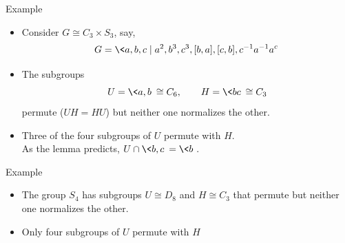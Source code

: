\begin{frame}[fragile,label=ExampleOfPermutingIso1,shrink=5]{Example}

  \begin{itemize}
  \item<1-> Consider $G\cong C_3 \times S_3$, say,
    \[G = \<a,b,c \mid a^2, b^3, c^3, [b,a], [c,b], c^{-1}a^{-1}a^c\>\]
\item<2->The subgroups 
\[U = \<a,b\> \cong C_6, \qquad H = \<bc\>\cong C_3\]
permute ($UH = HU$) but neither one normalizes the other.
  \end{itemize}
\vskip4mm
  \begin{itemize}
  \item<4-> Three of the four subgroups of $U$ permute with $H$.
\\[4pt] As the lemma predicts, $U\cap \<b, c\> = \<b\>$.
  \end{itemize}
\end{frame}


\begin{frame}[fragile,label=ExampleOfPermutingIso,shrink=5]{Example}

  \begin{itemize}
  \item<1-> The group $S_4$ has subgroups $U\cong D_8$ and $H\cong C_3$ that
    permute but neither one normalizes the other.
  \end{itemize}
\vskip4mm
\begin{itemize}
\item<2-> Only four subgroups of $U$ permute with $H$%
\end{itemize}
\end{frame}


